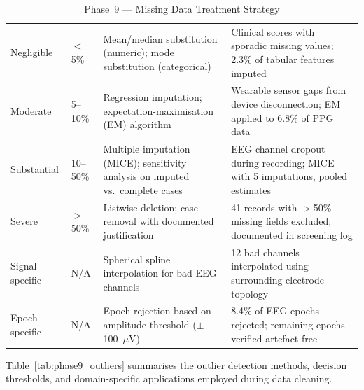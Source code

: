\begingroup\singlespacing\tablefontsize\tablestripes
\begin{xltabular}{\textwidth}{@{} l l X X @{}}
\caption{Phase~9 --- Missing Data Treatment Strategy}
\label{tab:phase9_missing}\\
\toprule
{} &  &  &  \\
\midrule
\endfirsthead
\endhead
\bottomrule
\endlastfoot
Negligible     & $<$5\%      & Mean/median substitution (numeric); mode substitution (categorical)      & Clinical scores with sporadic missing values; 2.3\% of tabular features imputed \\
\addlinespace
Moderate       & 5--10\%     & Regression imputation; expectation-maximisation (EM) algorithm           & Wearable sensor gaps from device disconnection; EM applied to 6.8\% of PPG data \\
\addlinespace
Substantial    & 10--50\%    & Multiple imputation (MICE); sensitivity analysis on imputed vs.\ complete cases & EEG channel dropout during recording; MICE with 5 imputations, pooled estimates \\
\addlinespace
Severe         & $>$50\%     & Listwise deletion; case removal with documented justification            & 41 records with $>$50\% missing fields excluded; documented in screening log \\
\addlinespace
Signal-specific & N/A        & Spherical spline interpolation for bad EEG channels                      & 12 bad channels interpolated using surrounding electrode topology \\
\addlinespace
Epoch-specific  & N/A        & Epoch rejection based on amplitude threshold ($\pm$100~$\mu$V)          & 8.4\% of EEG epochs rejected; remaining epochs verified artefact-free \\
\end{xltabular}
\endgroup

\vspace{1.5em}

Table~\ref{tab:phase9_outliers} summarises the outlier detection methods, decision thresholds, and domain-specific applications employed during data cleaning.

